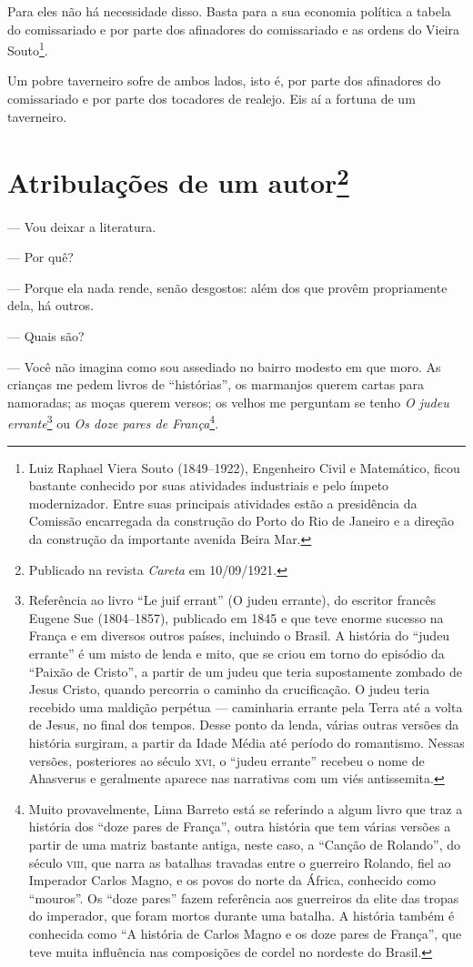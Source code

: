 Para eles não há necessidade disso. Basta para a sua economia política a
tabela do comissariado e por parte dos afinadores do comissariado e as
ordens do Vieira Souto\footnote{Luiz Raphael Viera Souto (1849--1922),
  Engenheiro Civil e Matemático, ficou bastante conhecido por suas
  atividades industriais e pelo ímpeto modernizador. Entre suas
  principais atividades estão a presidência da Comissão encarregada da
  construção do Porto do Rio de Janeiro e a direção da construção da
  importante avenida Beira Mar.}.

Um pobre taverneiro sofre de ambos lados, isto é, por parte dos
afinadores do comissariado e por parte dos tocadores de realejo. Eis aí
a fortuna de um taverneiro.



\chapter[Atribulações de um autor]{Atribulações de um autor\footnote[*]{Publicado na revista \emph{Careta} em 10/09/1921.}}

--- Vou deixar a literatura.

--- Por quê?

--- Porque ela nada rende, senão desgostos: além dos que provêm
propriamente dela, há outros.

--- Quais são?

--- Você não imagina como sou assediado no bairro modesto em que moro. As
crianças me pedem livros de ``histórias'', os marmanjos querem cartas
para namoradas; as moças querem versos; os velhos me perguntam se tenho
\emph{O judeu errante}\footnote{Referência ao livro ``Le juif errant''
  (O judeu errante), do escritor francês Eugene Sue (1804--1857),
  publicado em 1845 e que teve enorme sucesso na França e em diversos
  outros países, incluindo o Brasil. A história do ``judeu errante'' é
  um misto de lenda e mito, que se criou em torno do episódio da
  ``Paixão de Cristo'', a partir de um judeu que teria supostamente
  zombado de Jesus Cristo, quando percorria o caminho da crucificação. O
  judeu teria recebido uma maldição perpétua --- caminharia errante pela
  Terra até a volta de Jesus, no final dos tempos. Desse ponto da lenda,
  várias outras versões da história surgiram, a partir da Idade Média
  até período do romantismo. Nessas versões, posteriores ao século \textsc{xvi},
  o ``judeu errante'' recebeu o nome de Ahasverus e geralmente aparece
  nas narrativas com um viés antissemita.} ou \emph{Os doze pares de
França}\footnote{Muito provavelmente, Lima Barreto está se referindo a
  algum livro que traz a história dos ``doze pares de França'', outra
  história que tem várias versões a partir de uma matriz bastante
  antiga, neste caso, a ``Canção de Rolando'', do século \textsc{viii}, que narra
  as batalhas travadas entre o guerreiro Rolando, fiel ao Imperador
  Carlos Magno, e os povos do norte da África, conhecido como
  ``mouros''. Os ``doze pares'' fazem referência aos guerreiros da elite
  das tropas do imperador, que foram mortos durante uma batalha. A
  história também é conhecida como ``A história de Carlos Magno e os
  doze pares de França'', que teve muita influência nas composições de
  cordel no nordeste do Brasil.}.

